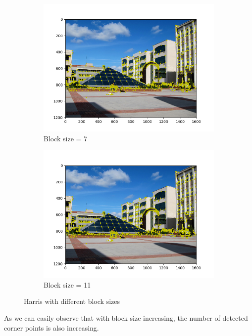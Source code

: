 \documentclass[12pt]{article}
\begin{document}
\begin{figure}[H]
\begin{subfigure}{0.45\textwidth}
        \centering
        \includegraphics[width=\textwidth, height=0.75\textwidth]{images/kuzey_harris-7.png}
        \caption{Block size = 7}
        \label{block-size-7}
    \end{subfigure}
    \begin{subfigure}{0.45\textwidth}
        \centering
        \includegraphics[width=\textwidth, height=0.75\textwidth]{images/kuzey_harris-11.png}
        \caption{Block size = 11}
        \label{block-size-11}
    \end{subfigure}
    \caption{Harris with different block sizes}
    \label{fig:bloc-size}
\end{figure}

As we can easily observe that with block size increasing, the number of detected corner points is also increasing.
\end{document}
